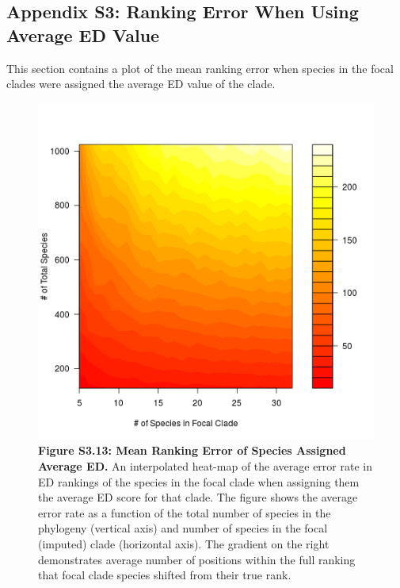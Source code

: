 \documentclass[10pt,english]{article}
\begin{document}
\subsection*{Appendix S3: Ranking Error When Using Average ED Value}

This section contains a plot of the mean ranking error when species in the focal
clades were assigned the average ED value of the clade.

\begin{figure}[!ht]
  \center
  \includegraphics[width=.5\textwidth]{../figures/rankingError_avgEDforClade.png}
  \caption*{\textbf{Figure S3.13: Mean Ranking Error of Species Assigned Average
  ED.} An interpolated heat-map of the average error rate in ED rankings of the
  species in the focal clade when assigning them the average ED score for that
  clade. The figure shows the average error rate as a function of the total number
  of species in the phylogeny (vertical axis) and number of species in the focal
  (imputed) clade (horizontal axis). The gradient on the right demonstrates
  average number of positions within the full ranking that focal clade species
  shifted from their true rank.}
\end{figure}
\end{document}
